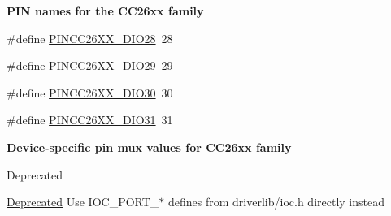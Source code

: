 \begin{Indent}{\bf P\+I\+N names for the C\+C26xx family}
\begin{DoxyCompactItemize}
\item 
\#define \hyperlink{_p_i_n_c_c26_x_x_8h_a1022f5ef1299a3d48c2816202fef95f8}{P\+I\+N\+C\+C26\+X\+X\+\_\+\+D\+I\+O28}~28
\item 
\#define \hyperlink{_p_i_n_c_c26_x_x_8h_a0aaff3357d986e4489e84a0ff3bff9dd}{P\+I\+N\+C\+C26\+X\+X\+\_\+\+D\+I\+O29}~29
\item 
\#define \hyperlink{_p_i_n_c_c26_x_x_8h_a2d36db877b96c9c26026c9c1c0514af3}{P\+I\+N\+C\+C26\+X\+X\+\_\+\+D\+I\+O30}~30
\item 
\#define \hyperlink{_p_i_n_c_c26_x_x_8h_aef532163bb931a46bcbcd00fc9ca8b18}{P\+I\+N\+C\+C26\+X\+X\+\_\+\+D\+I\+O31}~31
\end{DoxyCompactItemize}
\end{Indent}
\begin{Indent}{\bf Device-\/specific pin mux values for C\+C26xx family}\par
{\em \label{_p_i_n_c_c26_x_x_8h_PINCC26XX_MUX_VALS}%
\hypertarget{_p_i_n_c_c26_x_x_8h_PINCC26XX_MUX_VALS}{}%
 \begin{DoxyRefDesc}{Deprecated}
\item[\hyperlink{deprecated__deprecated000001}{Deprecated}]Use I\+O\+C\+\_\+\+P\+O\+R\+T\+\_\+$\ast$ defines from driverlib/ioc.\+h directly instead


\end{DoxyRefDesc}}
\end{Indent}
